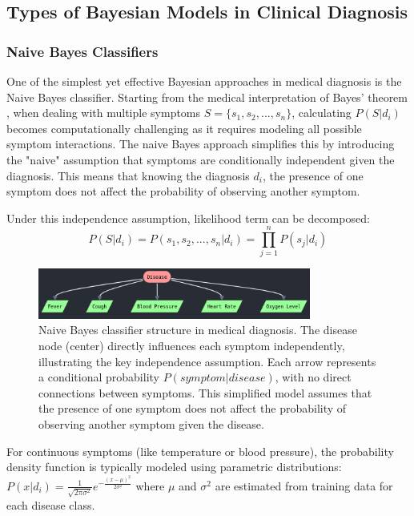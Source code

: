 \documentclass[3p,times,procedia]{elsarticle}
\begin{document}
\subsection{Types of Bayesian Models in Clinical Diagnosis}
\subsubsection{Naive Bayes Classifiers}
One of the simplest yet effective Bayesian approaches in medical diagnosis
is the Naive Bayes classifier. Starting from the medical interpretation of Bayes' 
theorem , when dealing with multiple symptoms 
$S = \{s_1, s_2, ..., s_n\}$, calculating $P(S|d_i)$ becomes computationally 
challenging as it requires modeling all possible symptom interactions. The naive 
Bayes approach simplifies this by introducing the "naive" assumption that symptoms 
are conditionally independent given the diagnosis. This means that knowing the 
diagnosis $d_i$, the presence of one symptom does not affect the probability of 
observing another symptom.

Under this independence assumption, likelihood term can be decomposed:
\begin{equation}
P(S|d_i) = P(s_1, s_2, ..., s_n|d_i) = \prod_{j=1}^{n} P(s_j|d_i)
\label{eq:naive_independence}
\end{equation}

\begin{figure}[h]
\centering
\includegraphics[width=0.8\textwidth]{figs/naive_bayes.png}
\caption{Naive Bayes classifier structure in medical diagnosis. The disease node (center) directly influences each symptom independently, illustrating the key independence assumption. Each arrow represents a conditional probability $P(symptom|disease)$, with no direct connections between symptoms. This simplified model assumes that the presence of one symptom does not affect the probability of observing another symptom given the disease.}
\label{fig:naive_bayes}
\end{figure}

For continuous symptoms (like temperature or blood pressure), the probability density function is typically modeled using parametric distributions:
$P(x|d_i) = \frac{1}{\sqrt{2\pi\sigma^2}} e^{-\frac{(x-\mu)^2}{2\sigma^2}}$
where $\mu$ and $\sigma^2$ are estimated from training data for each disease class.
\end{document}
